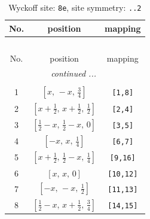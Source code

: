 \documentclass[fleqn,8pt]{jsarticle}
\begin{document}
\begin{longtable}{ccc}
\caption{Wyckoff site: {\tt 8e}, site symmetry: {\tt ..2}}
 \\
 \hline \hline
No. & position & mapping \\ \hline \endfirsthead

\multicolumn{2}{l}{\tablename\ \thetable{}} \\
 \hline \hline
No. & position & mapping \\ \hline \endhead

 \hline \hline
\multicolumn{2}{r}{\footnotesize\it continued ...} \\ \endfoot

 \hline \hline
\multicolumn{2}{r}{} \\ \endlastfoot

1 & $\left[ x,\, - x,\, \frac{3}{4} \right]$ & {\tt [1,8]} \\ \hline
2 & $\left[ x + \frac{1}{2},\, x + \frac{1}{2},\, \frac{1}{2} \right]$ & {\tt [2,4]} \\ \hline
3 & $\left[ \frac{1}{2} - x,\, \frac{1}{2} - x,\, 0 \right]$ & {\tt [3,5]} \\ \hline
4 & $\left[ - x,\, x,\, \frac{1}{4} \right]$ & {\tt [6,7]} \\ \hline
5 & $\left[ x + \frac{1}{2},\, \frac{1}{2} - x,\, \frac{1}{4} \right]$ & {\tt [9,16]} \\ \hline
6 & $\left[ x,\, x,\, 0 \right]$ & {\tt [10,12]} \\ \hline
7 & $\left[ - x,\, - x,\, \frac{1}{2} \right]$ & {\tt [11,13]} \\ \hline
8 & $\left[ \frac{1}{2} - x,\, x + \frac{1}{2},\, \frac{3}{4} \right]$ & {\tt [14,15]} \\
\end{longtable}
\renewcommand{\arraystretch}{1.2}
\end{document}
